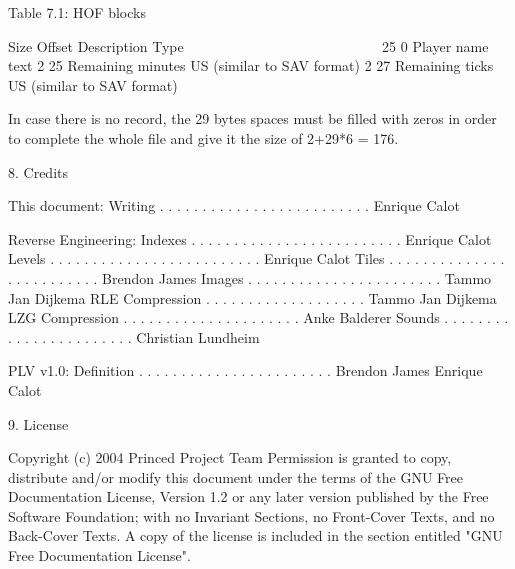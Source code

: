                    Table 7.1: HOF blocks
                   ~~~~~~~~~~~~~~~~~~~~~

   Size Offset Description                  Type
   ~~~~ ~~~~~~ ~~~~~~~~~~~                  ~~~~
     25      0 Player name                  text
      2     25 Remaining minutes            US (similar to SAV format)
      2     27 Remaining ticks              US (similar to SAV format)

 In case there is no record, the 29 bytes spaces must be filled with zeros
 in order to complete the whole file and give it the size of 2+29*6 = 176.


8. Credits
   ~~~~~~~

 This document:
  Writing . . . . . . . . . . . . . . . . . . . . . . . . . Enrique Calot

 Reverse Engineering:
  Indexes . . . . . . . . . . . . . . . . . . . . . . . . . Enrique Calot
  Levels . . . . . . . . . . . . . . . . . . . . . . . . .  Enrique Calot
  Tiles  . . . . . . . . . . . . . . . . . . . . . . . . .  Brendon James
  Images . . . . . . . . . . . . . . . . . . . . . . .  Tammo Jan Dijkema
  RLE Compression . . . . . . . . . . . . . . . . . . . Tammo Jan Dijkema
  LZG Compression . . . . . . . . . . . . . . . . . . . . . Anke Balderer
  Sounds . . . . . . . . . . . . . . . . . . . . . . . Christian Lundheim

 PLV v1.0:
  Definition . . . . . . . . . . . . . . . . . . . . . . .  Brendon James
                                                            Enrique Calot

9. License
   ~~~~~~~

      Copyright (c)  2004  Princed Project Team
      Permission is granted to copy, distribute and/or modify this document
      under the terms of the GNU Free Documentation License, Version 1.2
      or any later version published by the Free Software Foundation;
      with no Invariant Sections, no Front-Cover Texts, and no Back-Cover
      Texts.  A copy of the license is included in the section entitled
      "GNU Free Documentation License".

